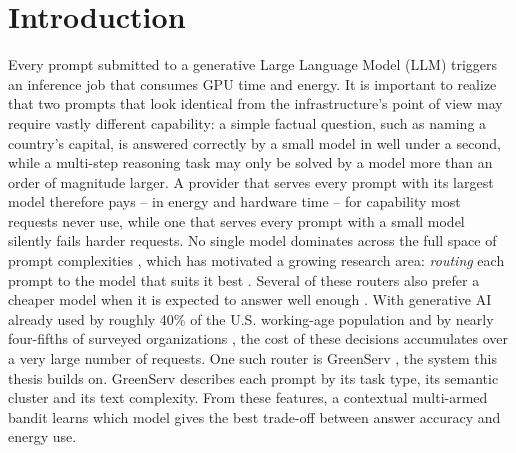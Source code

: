 \chapter{Introduction}
\label{chapter:introduction}

Every prompt submitted to a generative Large Language Model (LLM) triggers an inference job that consumes GPU time and energy.
It is important to realize that two prompts that look identical from the infrastructure's point of view may require vastly different capability:
a simple factual question, such as naming a country's capital, is answered correctly by a small model in well under a second, while a multi-step reasoning task may only be solved by a model more than an order of magnitude larger.
A provider that serves every prompt with its largest model therefore pays -- in energy and hardware time -- for capability most requests never use, while one that serves every prompt with a small model silently fails harder requests.
No single model dominates across the full space of prompt complexities \cite{greenserv, frugalgpt, routellm}, which has motivated a growing research area: \emph{routing} each prompt to the model that suits it best \cite{cargo, tagrouter, noft, irtrouter, lookahead, greenserv}.
Several of these routers also prefer a cheaper model when it is expected to answer well enough \cite{tagrouter, noft, irtrouter, greenserv}.
With generative AI already used by roughly 40\% of the U.S. working-age population \cite{Bick2024Rapid} and by nearly four-fifths of surveyed organizations \cite{McKinsey2025State}, the cost of these decisions accumulates over a very large number of requests.
One such router is GreenServ \cite{greenserv}, the system this thesis builds on.
GreenServ describes each prompt by its task type, its semantic cluster and its text complexity.
From these features, a contextual multi-armed bandit learns which model gives the best trade-off between answer accuracy and energy use.

